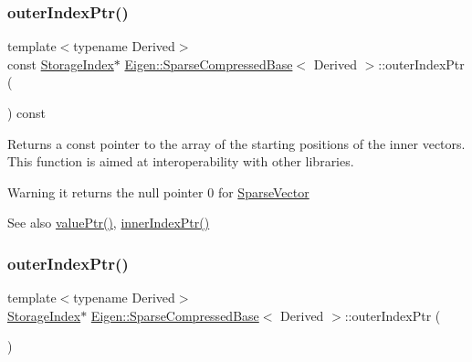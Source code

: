 \subsubsection{\texorpdfstring{outerIndexPtr()}{outerIndexPtr()}\hspace{0.1cm}{\footnotesize\ttfamily [1/2]}}
{\footnotesize\ttfamily template$<$typename Derived$>$ \\
const \mbox{\hyperlink{class_eigen_1_1_sparse_matrix_base_a0b540ba724726ebe953f8c0df06081ed}{Storage\+Index}}$\ast$ \mbox{\hyperlink{class_eigen_1_1_sparse_compressed_base}{Eigen\+::\+Sparse\+Compressed\+Base}}$<$ Derived $>$\+::outer\+Index\+Ptr (\begin{DoxyParamCaption}{ }\end{DoxyParamCaption}) const\hspace{0.3cm}{\ttfamily [inline]}}

\begin{DoxyReturn}{Returns}
a const pointer to the array of the starting positions of the inner vectors. This function is aimed at interoperability with other libraries. 
\end{DoxyReturn}
\begin{DoxyWarning}{Warning}
it returns the null pointer 0 for \mbox{\hyperlink{class_eigen_1_1_sparse_vector}{Sparse\+Vector}} 
\end{DoxyWarning}
\begin{DoxySeeAlso}{See also}
\mbox{\hyperlink{class_eigen_1_1_sparse_compressed_base_a0f12f72d14b6c277d09be9f5ce2eab95}{value\+Ptr()}}, \mbox{\hyperlink{class_eigen_1_1_sparse_compressed_base_a197111c1289644f1ea38fe683ccdd82a}{inner\+Index\+Ptr()}} 
\end{DoxySeeAlso}
\mbox{\label{class_eigen_1_1_sparse_compressed_base_a53a82f962686e18c8dc07a4b9a85ed7b}} 
\subsubsection{\texorpdfstring{outerIndexPtr()}{outerIndexPtr()}\hspace{0.1cm}{\footnotesize\ttfamily [2/2]}}
{\footnotesize\ttfamily template$<$typename Derived$>$ \\
\mbox{\hyperlink{class_eigen_1_1_sparse_matrix_base_a0b540ba724726ebe953f8c0df06081ed}{Storage\+Index}}$\ast$ \mbox{\hyperlink{class_eigen_1_1_sparse_compressed_base}{Eigen\+::\+Sparse\+Compressed\+Base}}$<$ Derived $>$\+::outer\+Index\+Ptr (\begin{DoxyParamCaption}{ }\end{DoxyParamCaption})\hspace{0.3cm}{\ttfamily [inline]}}

